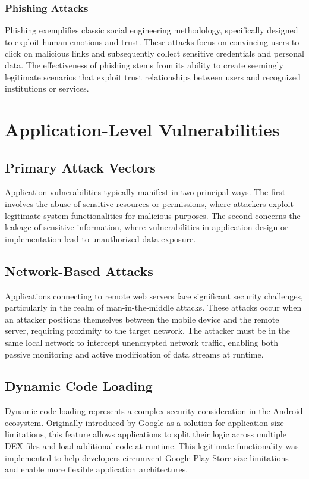 \documentclass{article}
\begin{document}
\subsubsection{Phishing Attacks}
Phishing exemplifies classic social engineering methodology, specifically designed to exploit human emotions and trust. These attacks focus on convincing users to click on malicious links and subsequently collect sensitive credentials and personal data. The effectiveness of phishing stems from its ability to create seemingly legitimate scenarios that exploit trust relationships between users and recognized institutions or services.

\section{Application-Level Vulnerabilities}
\subsection{Primary Attack Vectors}
Application vulnerabilities typically manifest in two principal ways. The first involves the abuse of sensitive resources or permissions, where attackers exploit legitimate system functionalities for malicious purposes. The second concerns the leakage of sensitive information, where vulnerabilities in application design or implementation lead to unauthorized data exposure.

\subsection{Network-Based Attacks}
Applications connecting to remote web servers face significant security challenges, particularly in the realm of man-in-the-middle attacks. These attacks occur when an attacker positions themselves between the mobile device and the remote server, requiring proximity to the target network. The attacker must be in the same local network to intercept unencrypted network traffic, enabling both passive monitoring and active modification of data streams at runtime.

\subsection{Dynamic Code Loading}
Dynamic code loading represents a complex security consideration in the Android ecosystem. Originally introduced by Google as a solution for application size limitations, this feature allows applications to split their logic across multiple DEX files and load additional code at runtime. This legitimate functionality was implemented to help developers circumvent Google Play Store size limitations and enable more flexible application architectures.
\end{document}
